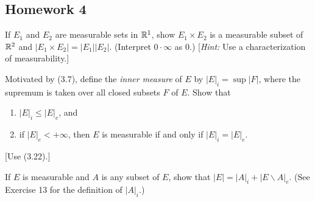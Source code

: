 \subsection{Homework 4}

\begin{problem}
If $E_1$ and $E_2$ are measurable sets in $\mathbb{R}^1$, show $E_1\times E_2$ is
a measurable subset of $\mathbb{R}^2$ and $|E_1\times E_2|=|E_1||E_2|$. (Interpret
$0\cdot\infty$ as $0$.) [\emph{Hint:} Use a characterization of
measurability.]
\end{problem}
\begin{solution}
\end{solution}

\begin{problem}
Motivated by (3.7), define the \emph{inner measure} of $E$ by
$|E|_i=\sup|F|$, where the supremum is taken over all closed subsets $F$ of
$E$. Show that
\begin{enumerate}[label=(\roman*),noitemsep]
\item $|E|_i\leq|E|_e$, and
\item if $|E|_e<+\infty$, then $E$ is measurable if and only if
  $|E|_i=|E|_e$.
\end{enumerate}
[Use (3.22).]
\end{problem}
\begin{solution}
\end{solution}

\begin{problem}
If $E$ is measurable and $A$ is any subset of $E$, show that
$|E|=|A|_i+|E\smallsetminus A|_e$. (See Exercise 13 for
the definition of $|A|_i$.)
\end{problem}
\begin{solution}
\end{solution}

